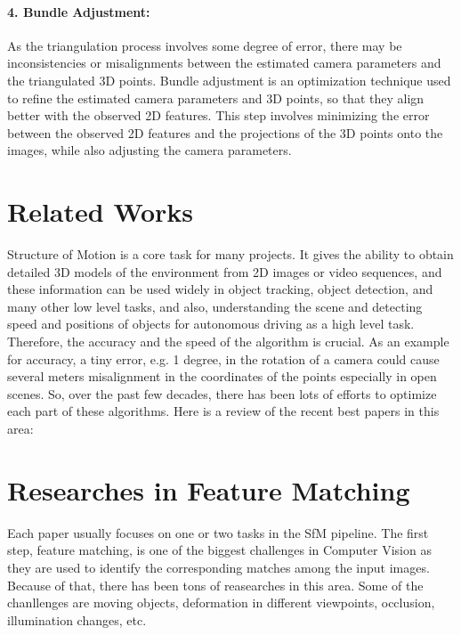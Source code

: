 \documentclass[11pt]{article}
\begin{document}
    \paragraph{4. Bundle Adjustment:} As the triangulation process involves some degree of error, there may be inconsistencies
    or misalignments between the estimated camera parameters and the triangulated 3D points. Bundle adjustment is
    an optimization technique used to refine the estimated camera parameters and 3D points, so that they align
    better with the observed 2D features. This step involves minimizing the error between the observed 2D features
    and the projections of the 3D points onto the images, while also adjusting the camera parameters.

    \section{Related Works}
    Structure of Motion is a core task for many projects. It gives the ability to obtain detailed 3D models
    of the environment from 2D images or video sequences, and these information can be used widely in object tracking,
    object detection, and many other low level tasks, and also, understanding the scene and detecting speed and
    positions of objects for autonomous driving as a high level task. Therefore, the accuracy and the speed
    of the algorithm is crucial. As an example for accuracy, a tiny error, e.g. 1 degree, in the rotation of
    a camera could cause several meters misalignment in the coordinates of the points especially in open scenes.
    So, over the past few decades, there has been lots of efforts to optimize each part of these algorithms.
    Here is a review of the recent best papers in this area:

    \newpage
    \section{Researches in Feature Matching}
    Each paper usually focuses on one or two tasks in the SfM pipeline. The first step, feature matching,
    is one of the biggest challenges in Computer Vision as they are used to identify the corresponding
    matches among the input images. Because of that, there has been tons of reasearches in this area.
    Some of the chanllenges are moving objects, deformation in different viewpoints, occlusion, illumination
    changes, etc.
\end{document}
